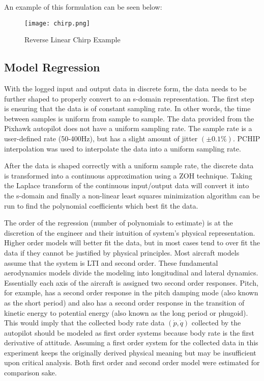 An example of this formulation can be seen below:

\begin{figure}[!h]
 \centering
  \texttt{[image: chirp.png]}
  \caption{Reverse Linear Chirp Example}
  \label{fig:chirp}
\end{figure}

\subsection{Model Regression}
With the logged input and output data in discrete form, the data needs to be further shaped to properly convert to an s-domain representation.  The first step is ensuring that the data is of constant sampling rate.  In other words, the time between samples is uniform from sample to sample.  The data provided from the Pixhawk autopilot does not have a uniform sampling rate.  The sample rate is a user-defined rate (50-400Hz), but has a slight amount of jitter $(\pm 0.1\%)$.  \ac{PCHIP} interpolation was used to interpolate the data into a uniform sampling rate.

After the data is shaped correctly with a uniform sample rate, the discrete data is transformed into a continuous approximation using a \ac{ZOH} technique.  Taking the Laplace transform of the continuous input/output data will convert it into the s-domain and finally a non-linear least squares minimization algorithm can be run to find the polynomial coefficients which best fit the data.

The order of the regression (number of polynomials to estimate) is at the discretion of the engineer and their intuition of system's physical representation.  Higher order models will better fit the data, but in most cases tend to over fit the data if they cannot be justified by physical principles.  Most aircraft models assume that the system is \ac{LTI} and second order.  These fundamental aerodynamics models divide the modeling into longitudinal and lateral dynamics.  Essentially each axis of the aircraft is assigned two second order responses.  Pitch, for example, has a second order response in the pitch damping mode (also known as the short period) and also has a second order response in the transition of kinetic energy to potential energy (also known as the long period or phugoid).  This would imply that the collected body rate data $(\dot{p},\dot{q})$ collected by the autopilot should be modeled as first order systems because body rate is the first derivative of attitude.  Assuming a first order system for the collected data in this experiment keeps the originally derived physical meaning but may be insufficient upon critical analysis.  Both first order and second order model were estimated for comparison sake.

